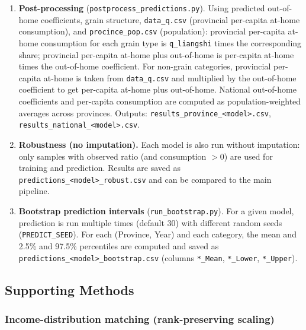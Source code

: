 \begin{enumerate}
  \item \textbf{Post-processing} (\texttt{postprocess\_predictions.py}).
  Using predicted out-of-home coefficients, grain structure, \texttt{data\_q.csv} (provincial per-capita at-home consumption), and \texttt{procince\_pop.csv} (population): provincial per-capita at-home consumption for each grain type is \texttt{q\_liangshi} times the corresponding share; provincial per-capita at-home plus out-of-home is per-capita at-home times the out-of-home coefficient. For non-grain categories, provincial per-capita at-home is taken from \texttt{data\_q.csv} and multiplied by the out-of-home coefficient to get per-capita at-home plus out-of-home. National out-of-home coefficients and per-capita consumption are computed as population-weighted averages across provinces. Outputs: \texttt{results\_province\_<model>.csv}, \texttt{results\_national\_<model>.csv}.

  \item \textbf{Robustness (no imputation).}
  Each model is also run without imputation: only samples with observed ratio (and consumption $>0$) are used for training and prediction. Results are saved as \texttt{predictions\_<model>\_robust.csv} and can be compared to the main pipeline.

  \item \textbf{Bootstrap prediction intervals} (\texttt{run\_bootstrap.py}).
  For a given model, prediction is run multiple times (default 30) with different random seeds (\texttt{PREDICT\_SEED}). For each (Province, Year) and each category, the mean and 2.5\% and 97.5\% percentiles are computed and saved as \texttt{predictions\_<model>\_bootstrap.csv} (columns \texttt{*\_Mean}, \texttt{*\_Lower}, \texttt{*\_Upper}).
\end{enumerate}

\subsection{Supporting Methods}

\subsubsection{Income-distribution matching (rank-preserving scaling)}
\label{sec:copula}


